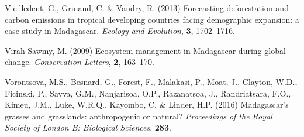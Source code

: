 \documentclass[]{article}
\theoremstyle{definition}
\theoremstyle{definition}
\theoremstyle{definition}
\theoremstyle{remark}
\begin{document}
\leavevmode\hypertarget{ref-Vieilledent2013}{}%
Vieilledent, G., Grinand, C. \& Vaudry, R. (2013) Forecasting
deforestation and carbon emissions in tropical developing countries
facing demographic expansion: a case study in Madagascar. \emph{Ecology
and Evolution}, \textbf{3}, 1702--1716.

\leavevmode\hypertarget{ref-Virah-Sawmy2009}{}%
Virah-Sawmy, M. (2009) Ecosystem management in Madagascar during global
change. \emph{Conservation Letters}, \textbf{2}, 163--170.

\leavevmode\hypertarget{ref-Vorontsova2017}{}%
Vorontsova, M.S., Besnard, G., Forest, F., Malakasi, P., Moat, J.,
Clayton, W.D., Ficinski, P., Savva, G.M., Nanjarisoa, O.P., Razanatsoa,
J., Randriatsara, F.O., Kimeu, J.M., Luke, W.R.Q., Kayombo, C. \&
Linder, H.P. (2016) Madagascar's grasses and grasslands: anthropogenic
or natural? \emph{Proceedings of the Royal Society of London B:
Biological Sciences}, \textbf{283}.
\end{document}

